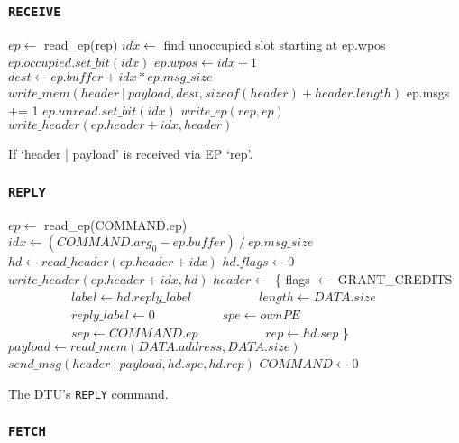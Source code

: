 \documentclass[a4paper,11pt,draft]{article}
\begin{document}
\subsubsection{\texttt{RECEIVE}}

\begin{algorithm}[H]
    $ep \gets$ read\_ep(rep)\;
    \BlankLine
    $idx \gets$ find unoccupied slot starting at ep.wpos\;
    $ep.occupied.set\_bit(idx)$\;
    $ep.wpos \gets idx + 1$\;
    \BlankLine
    $dest \gets ep.buffer + idx * ep.msg\_size$\;
    $write\_mem(header\ |\ payload, dest, sizeof(header) + header.length)$\;
    ep.msgs += 1\;
    $ep.unread.set\_bit(idx)$\;
    $write\_ep(rep, ep)$\;
    $write\_header(ep.header + idx, header)$\;
    \BlankLine
    \caption{If `header | payload' is received via EP `rep'.}
\end{algorithm}

\subsubsection{\texttt{REPLY}}

\begin{algorithm}[H]
    $ep \gets$ read\_ep(COMMAND.ep)\;
    \BlankLine
    $idx \gets (COMMAND.arg_0 - ep.buffer)\ /\ ep.msg\_size$\;
    $hd \gets read\_header(ep.header + idx)$\;
    \BlankLine
    $hd.flags \gets 0$\;
    $write\_header(ep.header + idx, hd)$\;
    \BlankLine
    $header \gets$ \{ flags $\gets$ GRANT\_CREDITS\;
    $\quad\quad\quad\quad\quad label \gets hd.reply\_label$\;
    $\quad\quad\quad\quad\quad length \gets DATA.size$\;
    $\quad\quad\quad\quad\quad reply\_label \gets 0$\;
    $\quad\quad\quad\quad\quad spe \gets ownPE$\;
    $\quad\quad\quad\quad\quad sep \gets COMMAND.ep$\;
    $\quad\quad\quad\quad\quad rep \gets hd.sep$ \}\;
    $payload \gets read\_mem(DATA.address, DATA.size)$\;
    $send\_msg(header\ |\ payload, hd.spe, hd.rep)$\;
    \BlankLine
    $COMMAND \gets 0$\;
    \caption{The DTU's \texttt{REPLY} command.}
\end{algorithm}

\subsubsection{\texttt{FETCH}}
\end{document}
